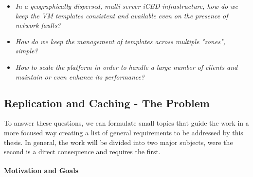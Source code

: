 \begin{itemize}
	\item \textit{In a geographically dispersed, multi-server iCBD infrastructure, how do we keep the VM templates consistent and available even on the presence of network faults?}
	\item \textit{How do we keep the management of templates across multiple "zones", simple?}
	\item \textit{How to scale the platform in order to handle a large number of clients and maintain or even enhance its performance?}
\end{itemize}




\subsection{Replication and Caching - The Problem}
\label{sec:replication_cache_theproblem}

To answer these questions, we can formulate small topics that guide the work in a more focused way creating a list of general requirements to be addressed by this thesis.
In general, the work will be divided into two major subjects, were the second is a direct consequence and requires the first.


\paragraph{Motivation and Goals}
\label{par:motivation_goals}


